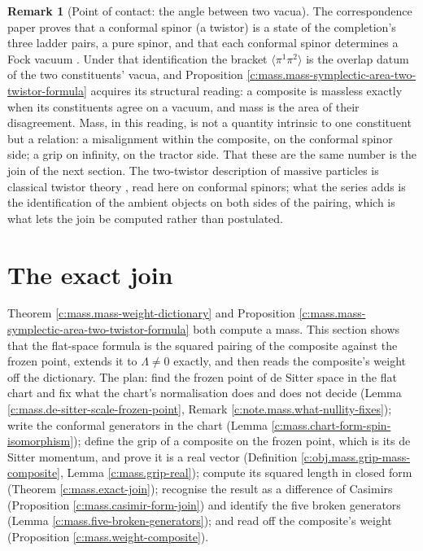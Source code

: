 \documentclass[11pt]{article}
\theoremstyle{definition}
\newtheorem{remark}[theorem]{Remark}
\theoremstyle{plain}
\newcommand{\changedmark}[2]{\marginpar{\raggedright\scriptsize\color{#1}#2}}
\providecommand{\br}{}\renewcommand{\br}[1]{\langle #1\rangle}
\begin{document}
\begin{remark}[Point of contact: the angle between two vacua]\label{c:note.mass.point-contact-angle-between-two-vacua}
\changedmark{gray}{reworded}
The correspondence paper proves that a conformal spinor (a twistor) is a state of the completion's three ladder pairs, a pure spinor, and that each conformal spinor determines a Fock vacuum \cite[Thm.~5.3]{ButlerT9}. Under that identification the bracket $\br{\pi^{1}\pi^{2}}$ is the overlap datum of the two constituents' vacua, and Proposition \ref{c:mass.mass-symplectic-area-two-twistor-formula} acquires its structural reading: a composite is massless exactly when its constituents agree on a vacuum, and mass is the area of their disagreement. Mass, in this reading, is not a quantity intrinsic to one constituent but a relation: a misalignment within the composite, on the conformal spinor side; a grip on infinity, on the tractor side. That these are the same number is the join of the next section. The two-twistor description of massive particles is classical twistor theory \cite{PenroseRindler1986, Hughston1979}, read here on conformal spinors; what the series adds is the identification of the ambient objects on both sides of the pairing, which is what lets the join be computed rather than postulated.
\end{remark}

\section{The exact join}

\label{c:note.mass.setting-exact-join}
Theorem \ref{c:mass.mass-weight-dictionary} and Proposition \ref{c:mass.mass-symplectic-area-two-twistor-formula} both compute a mass. This section shows that the flat-space formula is the squared pairing of the composite against the frozen point, extends it to $\Lambda \neq 0$ exactly, and then reads the composite's weight off the dictionary. The plan: find the frozen point of de Sitter space in the flat chart and fix what the chart's normalisation does and does not decide (Lemma \ref{c:mass.de-sitter-scale-frozen-point}, Remark \ref{c:note.mass.what-nullity-fixes}); write the conformal generators in the chart (Lemma \ref{c:mass.chart-form-spin-isomorphism}); define the grip of a composite on the frozen point, which is its de Sitter momentum, and prove it is a real vector (Definition \ref{c:obj.mass.grip-mass-composite}, Lemma \ref{c:mass.grip-real}); compute its squared length in closed form (Theorem \ref{c:mass.exact-join}); recognise the result as a difference of Casimirs (Proposition \ref{c:mass.casimir-form-join}) and identify the five broken generators (Lemma \ref{c:mass.five-broken-generators}); and read off the composite's weight (Proposition \ref{c:mass.weight-composite}).
\end{document}
